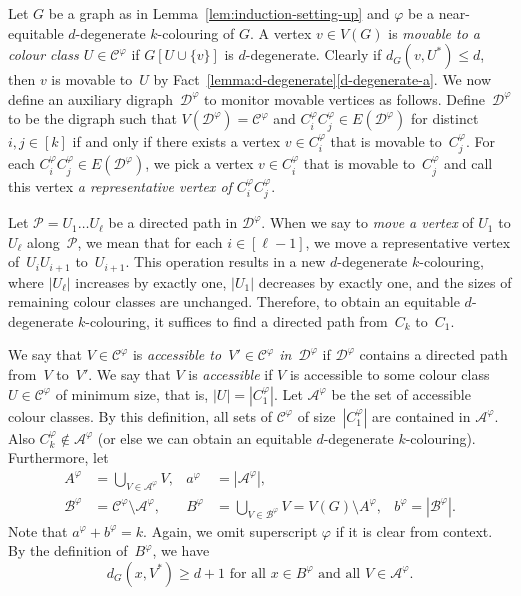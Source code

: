 \documentclass[11pt]{article}
\theoremstyle{plain}
\numberwithin{equation}{section}
\begin{document}
	Let $G$ be a graph as in Lemma~\ref{lem:induction-setting-up} and $\varphi$ be a near-equitable $d$-degenerate $k$-colouring of $G$.	
	A vertex $v\in V(G)$  is \emph{movable to  a colour class $U \in \mathcal{C}^\varphi$} if
    $G[U\cup \{v\}]$ is $d$-degenerate.
    Clearly if $d_{G}(v,U^*) \le d$, then $v$  is movable to~$U$ by Fact~\ref{lemma:d-degenerate}\ref{d-degenerate-a}.
    We now define an auxiliary digraph~$\mathcal{D}^\varphi$ to monitor movable vertices as follows.
	Define~$\mathcal{D}^\varphi$ to be the digraph  such that $V(\mathcal{D}^\varphi) = \mathcal{C}^\varphi$ and $C_i^\varphi C_j^\varphi \in E(\mathcal{D}^\varphi)$ for distinct $i,j\in [k]$ if and only if there exists a vertex $v \in C_i^\varphi$ that is movable to~$C_j^\varphi$.
	For each $C_i^\varphi C_j^\varphi \in E(\mathcal{D}^\varphi)$, we pick a vertex $v \in C_i^\varphi$ that is movable to~$C_j^\varphi$ and call this vertex \emph{a representative vertex of $C_i^\varphi C_j^\varphi$}.
			
			
	Let $\mathcal{P}=U_1\ldots U_\ell$  be a directed path in $\mathcal{D}^\varphi$.
	When we say to \emph{move a vertex} of $U_1$ to $U_\ell$ along~$\mathcal{P}$, we mean that for each $i \in [\ell-1]$, we move a representative vertex of~$U_{i}U_{i+1}$ to~$U_{i+1}$.
	This operation results in a new $d$-degenerate $k$-colouring, where $|U_{\ell}|$ increases  by exactly one, $|U_{1}|$ decreases by exactly one,  and the sizes of remaining colour classes are unchanged.
	Therefore, to obtain an equitable $d$-degenerate $k$-colouring, it suffices to find a directed path from~$C_k$ to~$C_1$.
	
	We say that $V \in \mathcal{C}^\varphi$ is \emph{accessible to~$V' \in \mathcal{C}^\varphi$ in~$\mathcal{D}^\varphi$} if $\mathcal{D}^\varphi$ contains a directed path from~$V$ to~$V'$.
	We say that $V$ is \emph{accessible} if $V$ is accessible to some colour class $U\in \mathcal{C}^\varphi$ of minimum size, that is,  $|U|=|C^\varphi_1|$.
	Let $\mathcal{A}^\varphi$ be the set of accessible colour classes.
	By this definition, all sets of $\mathcal{C}^\varphi$ of size~$|C^\varphi_1|$ are contained in $\mathcal{A}^\varphi$.
	Also $C_k^\varphi \notin \mathcal{A}^\varphi$ (or else we can obtain an equitable $d$-degenerate $k$-colouring).
	Furthermore, let
	\begin{align*}
		A^\varphi &= \bigcup_{V\in \mathcal{A}^\varphi}V, & a^\varphi&= |\mathcal{A}^\varphi|,\\
		\mathcal{B}^\varphi&=\mathcal{C}^\varphi\setminus \mathcal{A}^\varphi, &
		B^\varphi& =\bigcup_{V\in \mathcal{B}^\varphi}V = V(G)\setminus A^\varphi, &
		b^\varphi= |\mathcal{B}^\varphi|.
	\end{align*}
 Note that $a^\varphi+b^\varphi=k$.
Again, we omit superscript $\varphi$ if it is clear from context.
By the definition of~$B^\varphi$, we have
	  \begin{equation}\label{eqn:B-vertex-degree-in-A}
	  d_G(x, V^*) \ge d+1 \text{ for all $x\in B^\varphi$ and all $V\in \mathcal{A}^\varphi$.}
	  \end{equation}
\end{document}
